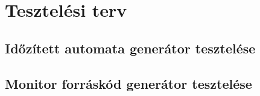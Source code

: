 \chapter{Tesztelési terv}

\section{Időzített automata generátor tesztelése}

\section{Monitor forráskód generátor tesztelése }
